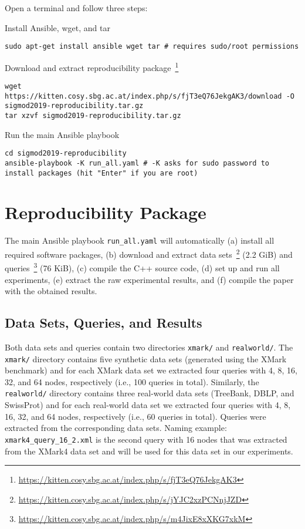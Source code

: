 \documentclass[a4, 10pt]{article}
\newenvironment{packed_enum}{
\begin{enumerate}
  \setlength{\itemsep}{1pt}
  \setlength{\parskip}{0pt}
  \setlength{\parsep}{0pt}
}{\end{enumerate}}
\begin{document}
Open a terminal and follow three steps:

\begin{packed_enum}
  \item Install Ansible, wget, and tar
\begin{lstlisting}[style=custombash]
sudo apt-get install ansible wget tar # requires sudo/root permissions
\end{lstlisting}
  \item Download and extract reproducibility package~\footnote{\url{https://kitten.cosy.sbg.ac.at/index.php/s/fjT3eQ76JekgAK3}}
\begin{lstlisting}[style=custombash]
wget https://kitten.cosy.sbg.ac.at/index.php/s/fjT3eQ76JekgAK3/download -O  sigmod2019-reproducibility.tar.gz
tar xzvf sigmod2019-reproducibility.tar.gz
\end{lstlisting}
  \item Run the main Ansible playbook
\begin{lstlisting}[style=custombash]
cd sigmod2019-reproducibility
ansible-playbook -K run_all.yaml # -K asks for sudo password to install packages (hit "Enter" if you are root)
\end{lstlisting}
\end{packed_enum}

\section{Reproducibility Package}

The main Ansible playbook \texttt{run\_all.yaml} will automatically (a) install all required software packages, (b) download and extract data sets~\footnote{\url{https://kitten.cosy.sbg.ac.at/index.php/s/jYJC2xzPCNnjJZD}} (2.2 GiB) and queries~\footnote{\url{https://kitten.cosy.sbg.ac.at/index.php/s/m4JixE8xXKG7xkM}} (76 KiB), (c) compile the C++ source code, (d) set up and run all experiments, (e) extract the raw experimental results, and (f) compile the paper with the obtained results.

\subsection{Data Sets, Queries, and Results}
\label{subsec:datasets-queries-results}

Both data sets and queries contain two directories \texttt{xmark/} and \texttt{realworld/}. The \texttt{xmark/} directory contains five synthetic data sets (generated using the XMark benchmark) and for each XMark data set we extracted four queries with 4, 8, 16, 32, and 64 nodes, respectively (i.e., 100 queries in total). Similarly, the \texttt{realworld/} directory contains three real-world data sets (TreeBank, DBLP, and SwissProt) and for each real-world data set we extracted four queries with 4, 8, 16, 32, and 64 nodes, respectively (i.e., 60 queries in total). Queries were extracted from the corresponding data sets. Naming example: \texttt{xmark4\_query\_16\_2.xml} is the second query with 16 nodes that was extracted from the XMark4 data set and will be used for this data set in our experiments. 
\end{document}
